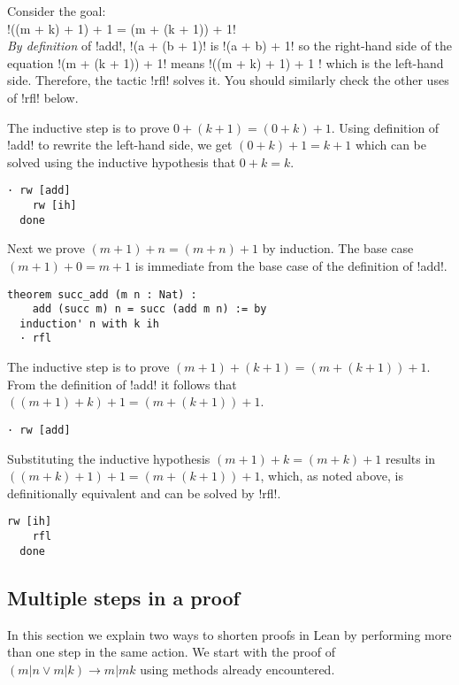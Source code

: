 
Consider the goal:\\
\indnt{}!((m + k) + 1) + 1 = (m + (k + 1)) + 1!\\
\emph{By definition} of !add!, !(a + (b + 1)! is !(a + b) + 1! so the right-hand side of the equation !(m + (k + 1)) + 1! means !((m + k) + 1) + 1 ! which is the left-hand side. Therefore, the tactic !rfl! solves it. You should similarly check the other uses of !rfl! below.

The inductive step is to prove $0+(k+1)=(0+k)+1$. Using definition of !add! to rewrite the left-hand side, we get $(0+k)+1=k+1$ which can be solved using the inductive hypothesis that $0+k=k$.
\begin{Verbatim}[firstnumber=last]
  · rw [add]
    rw [ih]
  done
\end{Verbatim}

Next we prove $(m+1)+n = (m+n)+1$ by induction. The base case $(m+1)+0=m+1$ is immediate from the base case of the definition of !add!.
\begin{Verbatim}[firstnumber=last]
theorem succ_add (m n : Nat) :
    add (succ m) n = succ (add m n) := by
  induction' n with k ih
  · rfl
\end{Verbatim}

The inductive step is to prove $(m+1) + (k+1) = (m + (k+1)) + 1$. From the definition of !add! it follows that $((m+1) + k) + 1 = (m + (k+1)) + 1$.
\begin{Verbatim}[firstnumber=last]
  · rw [add]
\end{Verbatim}
Substituting the inductive hypothesis $(m+1) + k = (m+k) + 1$ results in $((m+k) + 1) + 1 = (m + (k+1)) + 1$, which, as noted above, is definitionally equivalent and can be solved by !rfl!.
\begin{Verbatim}[firstnumber=last]
    rw [ih]
    rfl
  done
\end{Verbatim}

\subsection{Multiple steps in a proof}

In this section we explain two ways to shorten proofs in Lean by performing more than one step in the same action. We start with the proof of $(m|n \vee m|k) \rightarrow m | mk$ using methods already encountered.

